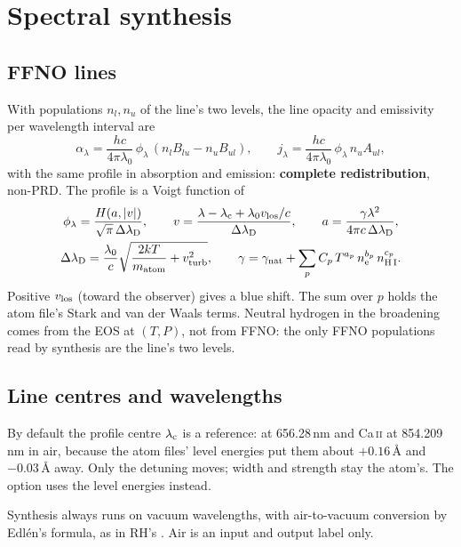 \section{Spectral synthesis}

\subsection{FFNO lines}
With populations $n_l,n_u$ of the line's two levels, the line opacity and emissivity per wavelength interval are
\begin{equation}
\alpha_\lambda=\frac{hc}{4\pi\lambda_0}\,\phi_\lambda\,(n_lB_{lu}-n_uB_{ul}),\qquad j_\lambda=\frac{hc}{4\pi\lambda_0}\,\phi_\lambda\,n_uA_{ul},
\end{equation}
with the same profile in absorption and emission: \textbf{complete redistribution}, non-PRD. The profile is a Voigt function of
\begin{gather}
\phi_\lambda=\frac{H(a,|v|)}{\sqrt\pi\,\Delta\lambda_{\rm D}},\qquad v=\frac{\lambda-\lambda_{\rm c}+\lambda_0v_{\rm los}/c}{\Delta\lambda_{\rm D}},\qquad a=\frac{\gamma\lambda^2}{4\pi c\,\Delta\lambda_{\rm D}},\\
\Delta\lambda_{\rm D}=\frac{\lambda_0}{c}\sqrt{\frac{2kT}{m_{\rm atom}}+v_{\rm turb}^2},\qquad \gamma=\gamma_{\rm nat}+\sum_p C_p\,T^{a_p}\,n_{\rm e}^{b_p}\,n_{\rm H\,I}^{c_p}.
\end{gather}
Positive $v_{\rm los}$ (toward the observer) gives a blue shift. The sum over $p$ holds the atom file's Stark and van der Waals terms. Neutral hydrogen in the broadening comes from the EOS at $(T,P)$, not from FFNO: the only FFNO populations read by synthesis are the line's two levels.

\subsection{Line centres and wavelengths}
By default the profile centre $\lambda_{\rm c}$ is a reference: \Halpha{} at 656.28\,nm and Ca\,\textsc{ii} at 854.209\,nm in air, because the atom files' level energies put them about $+0.16$\,\AA{} and $-0.03$\,\AA{} away. Only the detuning moves; width and strength stay the atom's. The option  uses the level energies instead.

Synthesis always runs on vacuum wavelengths, with air-to-vacuum conversion by Edl\'en's formula, as in RH's . Air is an input and output label only.

